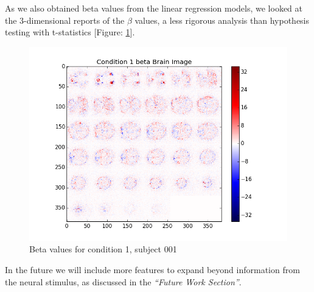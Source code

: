 As we also obtained beta values from the linear regression models, we looked at the 3-dimensional reports of the $\beta$ values, a less rigorous analysis than hypothesis testing with t-statistics [Figure: \ref{fig:con1_beta_brain}]. 

\begin{figure}[ht]
\centering
\includegraphics[scale=.5]{images/mr_cond1_beta_brain}    
\caption{Beta values for condition 1, subject 001}
\label{fig:con1_beta_brain}
\end{figure}


In the future we will include more features to expand beyond information from the neural stimulus, as discussed in the \textit{“Future Work Section”}. 